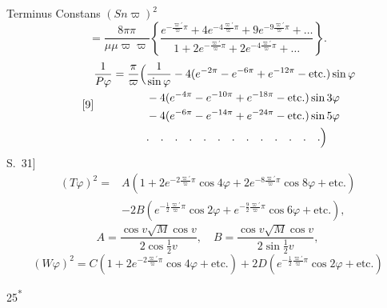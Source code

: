 \noindent Terminus Constans \((Sn\varpi)^2\)
\begin{equation*}\tag*{[7]}
=\frac{8\pi\pi}{\mu\mu\varpi\varpi}
\left\{\frac{e^{-\frac{\varpi'}\varpi\pi}+4e^{-4\frac{\varpi'}\varpi\pi}+9e^{-9\frac{\varpi'}\varpi\pi}+\ldots}
{1+2e^{-\frac{\varpi'}\varpi\pi}+2e^{-4\frac{\varpi'}\varpi\pi}+\ldots}\right\}.
\end{equation*}
\ClosingRule
{}
\begin{equation*}\tag*{[9]}
\begin{aligned}
\frac1{P\varphi}=\frac\pi\varpi\Bigl(&\frac1{\sin\varphi}-4(e^{-2\pi}-e^{-6\pi}+e^{-12\pi}-\text{etc.})\sin\varphi\\
&-4(e^{-4\pi}-e^{-10\pi}+e^{-18\pi}-\text{etc.})\sin3\varphi\\
&-4(e^{-6\pi}-e^{-14\pi}+e^{-24\pi}-\text{etc.})\sin5\varphi\\
&.\quad.\quad.\quad.\quad.\quad.\quad.\quad.\quad.\quad.\quad.\quad.\quad.\Bigr)
\end{aligned}
\end{equation*}
\ClosingRule
{}
\noindent S.\ 31]
\begin{equation*}\tag*{[10]}
\begin{aligned}
(T\varphi)^2={}&A(1+2e^{-2\frac{\varpi'}\varpi\pi}\cos4\varphi+2e^{-8\frac{\varpi'}\varpi\pi}\cos8\varphi+\text{etc.})\\
&-2B(e^{-\frac12\frac{\varpi'}\varpi\pi}\cos2\varphi+e^{-\frac92\frac{\varpi'}\varpi\pi}\cos6\varphi+\text{etc.}),
\end{aligned}
\end{equation*}
\begin{equation*}\tag*{[11]}
A=\frac{\cos v\surd M\cos v}{2\cos\frac12v},\quad B=\frac{\cos v\surd M\cos v}{2\sin\frac12v},
\end{equation*}
{\small
\begin{equation*}\tag*{[12]}
(W\varphi)^2=C(1+2e^{-2\frac{\varpi'}\varpi\pi}\cos4\varphi+\text{etc.})
+2D(e^{-\frac12\frac{\varpi'}\varpi\pi}\cos2\varphi+\text{etc.})
\end{equation*}}
\par\hfill25\textsuperscript{*}
\clearpage
{}

